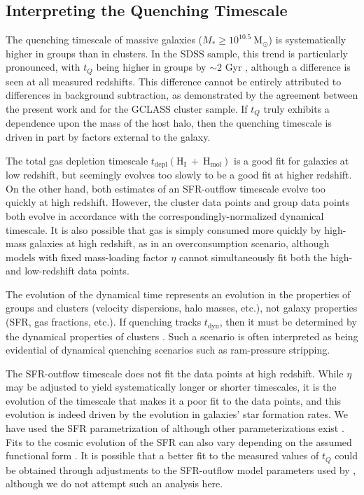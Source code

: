 \subsection{Interpreting the Quenching Timescale}

The quenching timescale of massive galaxies ($M_* \geq 10^{10.5}~ \mathrm{M}_\odot$) is systematically higher in groups than in clusters.
In the SDSS sample, this trend is particularly pronounced, with $t_Q$ being higher in groups by $\sim2$ Gyr \citep{Balogh:2016aa}, although a difference is seen at all measured redshifts.
This difference cannot be entirely attributed to differences in background subtraction, as demonstrated by the agreement between the present work and \citet{Balogh:2016aa} for the GCLASS cluster sample.
If $t_Q$ truly exhibits a dependence upon the mass of the host halo, then the quenching timescale is driven in part by factors external to the galaxy.

The total gas depletion timescale $t_{\mathrm{depl}}(\mathrm{H_I}~+~\mathrm{H_{mol}})$ is a good fit for galaxies at low redshift, but seemingly evolves too slowly to be a good fit at higher redshift.
On the other hand, both estimates of an SFR-outflow timescale evolve too quickly at high redshift.
However, the cluster data points and group data points both evolve in accordance with the correspondingly-normalized dynamical timescale.
It is also possible that gas is simply consumed more quickly by high-mass galaxies at high redshift, as in an overconsumption scenario, although models with fixed mass-loading factor $\eta$ cannot simultaneously fit both the high- and low-redshift data points.

The evolution of the dynamical time represents an evolution in the properties of groups and clusters (velocity dispersions, halo masses, etc.), not galaxy properties (SFR, gas fractions, etc.).
If quenching tracks $t_\mathrm{dyn}$, then it must be determined by the dynamical properties of clusters .
Such a scenario is often interpreted as being evidential of dynamical quenching scenarios such as ram-pressure stripping.

The SFR-outflow timescale does not fit the data points at high redshift.
While $\eta$ may be adjusted to yield systematically longer or shorter timescales, it is the evolution of the timescale that makes it a poor fit to the data points, and this evolution is indeed driven by the evolution in galaxies' star formation rates.
We have used the SFR parametrization of \citet{Whitaker:2012aa} although other parameterizations exist \citep{Peng:2010aa}.
Fits to the cosmic evolution of the SFR can also vary depending on the assumed functional form \citep{Behroozi:2013aa}.
It is possible that a better fit to the measured values of $t_Q$ could be obtained through adjustments to the SFR-outflow model parameters used by \citet{McGee:2014aa}, although we do not attempt such an analysis here.

